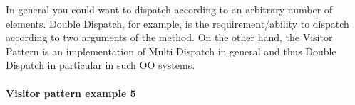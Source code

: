 \documentclass{book}
\begin{document}
In general you could want to dispatch according to an arbitrary number of elements. Double Dispatch, for example, is the requirement/ability to dispatch according to two arguments of the method.
On the other hand, the Visitor Pattern is an implementation of Multi Dispatch in general and thus Double Dispatch in particular in such OO systems.


\paragraph{Visitor pattern example 5}
\end{document}
